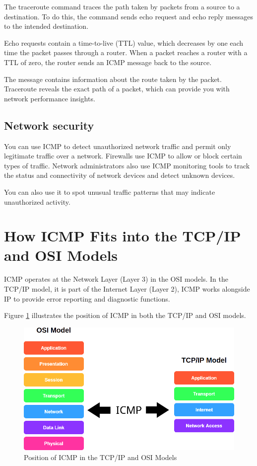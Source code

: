 The traceroute command traces the path taken by packets from a source to a destination. To do this, the command sends echo request and echo reply messages to the intended destination.

Echo requests contain a time-to-live (TTL) value, which decreases by one each time the packet passes through a router. When a packet reaches a router with a TTL of zero, the router sends an ICMP message back to the source.

The message contains information about the route taken by the packet. Traceroute reveals the exact path of a packet, which can provide you with network performance insights.

\subsection{Network security}
You can use ICMP to detect unauthorized network traffic and permit only legitimate traffic over a network. Firewalls use ICMP to allow or block certain types of traffic. Network administrators also use ICMP monitoring tools to track the status and connectivity of network devices and detect unknown devices.

You can also use it to spot unusual traffic patterns that may indicate unauthorized activity.

\section{How ICMP Fits into the TCP/IP and OSI Models}
ICMP operates at the Network Layer (Layer 3) in the OSI models. In the TCP/IP model, it is part of the Internet Layer (Layer 2), ICMP works alongside IP to provide error reporting and diagnostic functions.

\noindent Figure \ref{fig:icmp_models} illustrates the position of ICMP in both the TCP/IP and OSI models.


\begin{figure}[h]
	\centering
	\includegraphics[width=1\textwidth]{assets/layers2.png}
	\caption{Position of ICMP in the TCP/IP and OSI Models}
	\label{fig:icmp_models}
\end{figure}

\newpage



 








